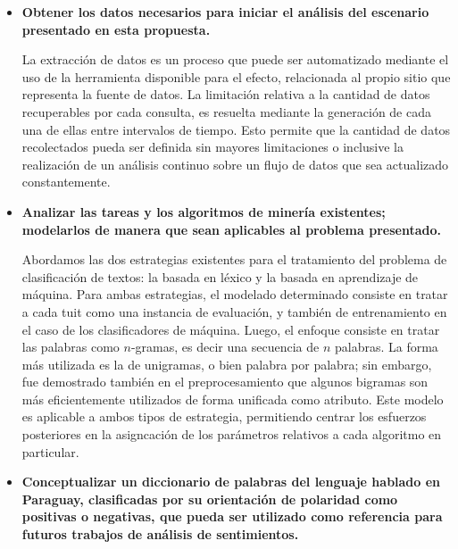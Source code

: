 \begin{itemize}
\item \textbf{Obtener los datos necesarios para iniciar el an\'alisis del escenario presentado en esta propuesta.}
\newline

La extracci\'on de datos es un proceso que puede ser automatizado mediante el uso de la herramienta disponible para el efecto, relacionada al propio sitio que representa la fuente de datos. La limitaci\'on relativa a la cantidad de datos recuperables por cada consulta, es resuelta mediante la generaci\'on de cada una de ellas entre intervalos de tiempo. Esto permite que la cantidad de datos recolectados pueda ser definida sin mayores limitaciones o inclusive la realizaci\'on de un an\'alisis continuo sobre un flujo de datos que sea actualizado constantemente.
\newline

\item \textbf{Analizar las tareas y los algoritmos de miner\'ia existentes; modelarlos de manera que sean aplicables al problema presentado.}
\newline

Abordamos las dos estrategias existentes para el tratamiento del problema de clasificaci\'on de textos: la basada en l\'exico y la basada en aprendizaje de m\'aquina. Para ambas estrategias, el modelado determinado consiste en tratar a cada tuit como una instancia de evaluaci\'on, y tambi\'en de entrenamiento en el caso de los clasificadores de m\'aquina. Luego, el enfoque consiste en tratar las palabras como $n$-gramas, es decir una secuencia de $n$ palabras. La forma m\'as utilizada es la de unigramas, o bien palabra por palabra; sin embargo, fue demostrado tambi\'en en el preprocesamiento que algunos bigramas son m\'as eficientemente utilizados de forma unificada como atributo. Este modelo es aplicable a ambos tipos de estrategia, permitiendo centrar los esfuerzos posteriores en la asigncaci\'on de los par\'ametros relativos a cada algoritmo en particular.
\newline

\item \textbf{Conceptualizar un diccionario de palabras del lenguaje hablado en Paraguay, clasificadas por su orientaci\'on de polaridad como positivas o negativas, que pueda ser utilizado como referencia para futuros trabajos de an\'alisis de sentimientos.}
\newline


\end{itemize}
